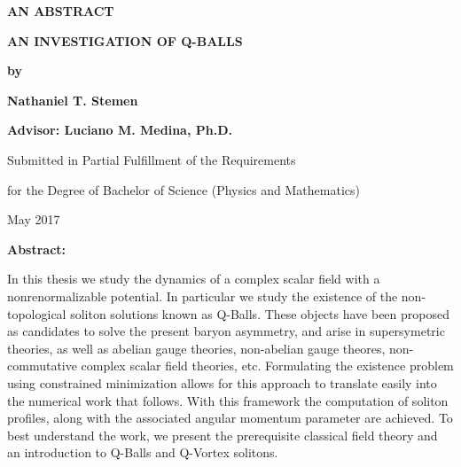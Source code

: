 \documentclass[12pt]{report}
\theoremstyle{definition}
\begin{document}
\begin{center}
\begin{minipage}{\linewidth}
    \centering

    \textbf{AN ABSTRACT} \\ \vspace{1.cm}

    \textbf{AN INVESTIGATION OF Q-BALLS} \\ \vspace{0.5cm}

    \textbf{by} \\ \vspace{0.75cm}

    \textbf{Nathaniel T. Stemen} \\ \vspace{0.75cm}

    \textbf{Advisor: Luciano M. Medina, Ph.D.} \\ \vspace{1.cm}

    {Submitted in Partial Fulfillment of the Requirements} \\ \vspace{0.5cm}

    {for the Degree of Bachelor of Science (Physics and Mathematics)} \\ \vspace{1.cm}

    {May 2017} \\ \vspace{0.5cm}

    {\textbf{Abstract:}}

    {In this thesis we study the dynamics of a complex scalar field with a
    nonrenormalizable potential. In particular we study the existence of the
    non-topological soliton solutions known as Q-Balls. These objects have been
    proposed as candidates to solve the present baryon asymmetry, and arise in
    supersymetric theories, as well as abelian gauge theories, non-abelian gauge
    theores, non-commutative complex scalar field theories, etc. Formulating the
    existence problem using constrained minimization allows for this approach to
    translate easily into the numerical work that follows. With this framework
    the computation of soliton profiles, along with the associated angular
    momentum parameter are achieved. To best understand the work, we present the
    prerequisite classical field theory and an introduction to Q-Balls and
    Q-Vortex solitons.}
\end{minipage}
\end{center}
\clearpage
\end{document}
